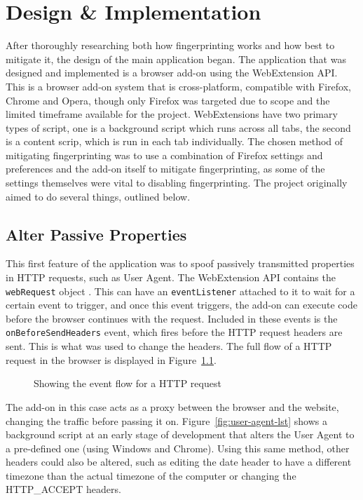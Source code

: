 \chapter{Design \& Implementation}

After thoroughly researching both how fingerprinting works and how best to mitigate it, the design of the main application began.
The application that was designed and implemented is a browser add-on using the WebExtension API\@.
This is a browser add-on system that is cross-platform, compatible with Firefox, Chrome and Opera, though only Firefox was targeted due to scope and the limited timeframe available for the project.
WebExtensions have two primary types of script, one is a background script which runs across all tabs, the second is a content scrip, which is run in each tab individually.
The chosen method of mitigating fingerprinting was to use a combination of Firefox settings and preferences and the add-on itself to mitigate fingerprinting, as some of the settings themselves were vital to disabling fingerprinting.
The project originally aimed to do several things, outlined below.

\section{Alter Passive Properties}

This first feature of the application was to spoof passively transmitted properties in HTTP requests, such as User Agent.
The WebExtension API contains the \texttt{webRequest} object \citep{webRequest}.
This can have an \texttt{eventListener} attached to it to wait for a certain event to trigger, and once this event triggers, the add-on can execute code before the browser continues with the request.
Included in these events is the \texttt{onBeforeSendHeaders} event, which fires before the HTTP request headers are sent.
This is what was used to change the headers.
The full flow of a HTTP request in the browser is displayed in Figure~\ref{fig:webRequest-flow}.

\begin{figure}[h]
\centering
\caption{Showing the event flow for a HTTP request}
\label{fig:webRequest-flow}
\end{figure}

The add-on in this case acts as a proxy between the browser and the website, changing the traffic before passing it on.
Figure~\ref{fig:user-agent-lst} shows a background script at an early stage of development that alters the User Agent to a pre-defined one (using Windows and Chrome).
Using this same method, other headers could also be altered, such as editing the date header to have a different timezone than the actual timezone of the computer or changing the HTTP\_ACCEPT headers.

